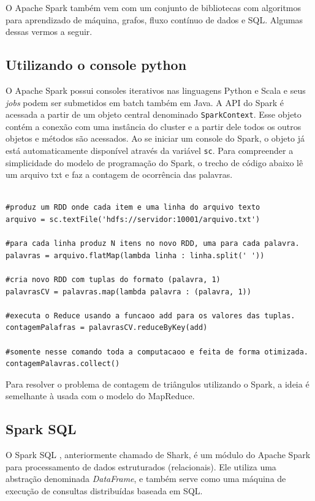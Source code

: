 O Apache Spark também vem com um conjunto de bibliotecas com algoritmos para aprendizado de máquina, 
grafos, fluxo contínuo de dados e SQL. Algumas dessas vermos a seguir.

\subsection{Utilizando o console python}
O Apache Spark possui consoles iterativos nas linguagens Python e Scala e seus \textit{jobs} podem 
ser submetidos em batch também em Java. A API do Spark é acessada a partir de um objeto central 
denominado \texttt{SparkContext}. Esse objeto contém a conexão com uma instância do cluster e a partir 
dele todos os outros objetos e métodos são acessados. Ao se iniciar um console do Spark, o objeto já 
está automaticamente disponível através da variável \texttt{sc}. Para compreender a simplicidade 
do modelo de programação do Spark, o trecho de código abaixo lê um arquivo txt e faz a contagem de 
ocorrência das palavras.

\begin{lstlisting}[style=MyPythonStyle]

#produz um RDD onde cada item e uma linha do arquivo texto
arquivo = sc.textFile('hdfs://servidor:10001/arquivo.txt') 

#para cada linha produz N itens no novo RDD, uma para cada palavra.
palavras = arquivo.flatMap(lambda linha : linha.split(' ')) 

#cria novo RDD com tuplas do formato (palavra, 1)
palavrasCV = palavras.map(lambda palavra : (palavra, 1)) 

#executa o Reduce usando a funcaoo add para os valores das tuplas.
contagemPalafras = palavrasCV.reduceByKey(add) 

#somente nesse comando toda a computacaoo e feita de forma otimizada.
contagemPalavras.collect() 

\end{lstlisting}

Para resolver o problema de contagem de triângulos utilizando o Spark, a ideia é semelhante à usada com 
o modelo do MapReduce.

\subsection{Spark SQL}
O Spark SQL \citep{xin2013shark, armbrust2015spark}, anteriormente chamado de Shark, é um módulo do Apache 
Spark para processamento de dados estruturados (relacionais). Ele utiliza uma abstração denominada 
\emph{DataFrame}, e também serve como uma máquina de execução de consultas distribuídas baseada em SQL. 

